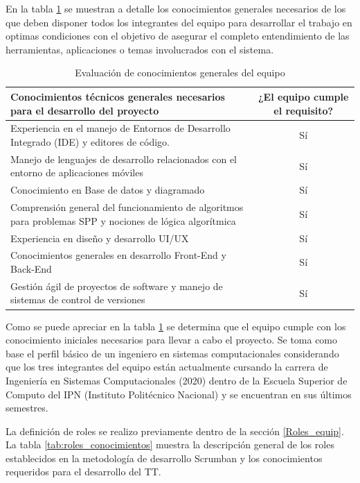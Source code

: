 En la tabla \ref{tab:conoc_generales} se muestran a detalle los conocimientos generales necesarios de los que deben disponer todos los integrantes del equipo para desarrollar el trabajo en optimas condiciones con el objetivo de asegurar el completo entendimiento de las herramientas, aplicaciones o temas involucrados con el sistema. 

\begin{table}[htbp]
\centering
\caption{Evaluación de conocimientos generales del equipo}
\label{tab:conoc_generales}
\begin{tabular}{| >{\centering\arraybackslash}m{} | c |}
\hline
\textbf{Conocimientos técnicos generales necesarios para el desarrollo del proyecto} & \textbf{¿El equipo cumple el requisito?} \\ \hline
Experiencia en el manejo de Entornos de Desarrollo Integrado (IDE) y editores de código. & Sí \\ \hline
Manejo de lenguajes de desarrollo relacionados con el entorno de aplicaciones móviles & Sí \\ \hline
Conocimiento en Base de datos y diagramado & Sí \\ \hline
Comprensión general del funcionamiento de algoritmos para problemas SPP y nociones de lógica algorítmica & Sí \\ \hline
Experiencia en diseño y desarrollo UI/UX & Sí \\ \hline
Conocimientos generales en desarrollo Front-End y Back-End & Sí \\ \hline
Gestión ágil de proyectos de software y manejo de sistemas de control de versiones & Sí \\ \hline

\end{tabular}
\end{table}

Como se puede apreciar en la tabla \ref{tab:conoc_generales} se determina que el equipo cumple con los conocimiento iniciales necesarios para llevar a cabo el proyecto. Se toma como base el perfil básico de un ingeniero en sistemas computacionales considerando que los tres integrantes del equipo están actualmente cursando la carrera de Ingeniería en Sistemas Computacionales (2020) dentro de la Escuela Superior de Computo del IPN (Instituto Politécnico Nacional) y se encuentran en sus últimos semestres.

La definición de roles se realizo previamente dentro de la sección \ref{Roles_equip}. La tabla \ref{tab:roles_conocimientos} muestra la descripción general de los roles establecidos en la metodología de desarrollo Scrumban y los conocimientos requeridos para el desarrollo del TT. 

